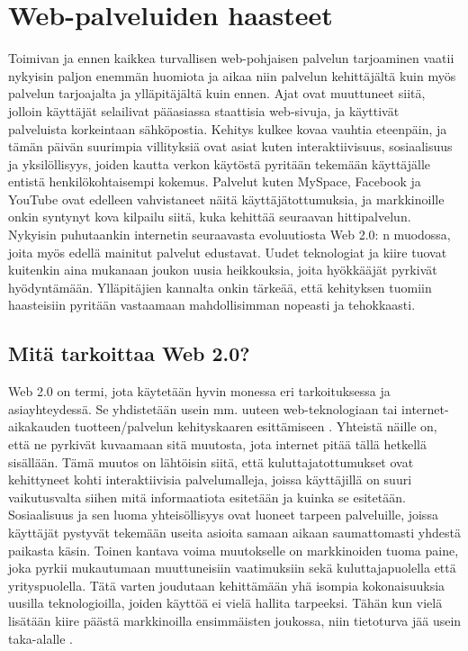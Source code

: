 
\chapter{Web-palveluiden haasteet}

Toimivan ja ennen kaikkea turvallisen web-pohjaisen palvelun tarjoaminen vaatii
nykyisin paljon enemmän huomiota ja aikaa niin palvelun kehittäjältä kuin myös
palvelun tarjoajalta ja ylläpitäjältä kuin ennen. Ajat ovat muuttuneet siitä,
jolloin käyttäjät selailivat pääasiassa staattisia web-sivuja, ja käyttivät
palveluista korkeintaan sähköpostia. Kehitys kulkee kovaa vauhtia eteenpäin, ja
tämän päivän suurimpia villityksiä ovat asiat kuten interaktiivisuus,
sosiaalisuus ja yksilöllisyys, joiden kautta verkon käytöstä pyritään tekemään
käyttäjälle entistä henkilökohtaisempi kokemus. Palvelut kuten MySpace,
Facebook ja YouTube ovat edelleen vahvistaneet näitä käyttäjätottumuksia, ja
markkinoille onkin syntynyt kova kilpailu siitä, kuka kehittää seuraavan
hittipalvelun. Nykyisin puhutaankin internetin seuraavasta evoluutiosta Web 2.0:
n muodossa, joita myös edellä mainitut palvelut edustavat. Uudet teknologiat ja
kiire tuovat kuitenkin aina mukanaan joukon uusia heikkouksia, joita hyökkääjät
pyrkivät hyödyntämään. Ylläpitäjien kannalta onkin tärkeää, että kehityksen
tuomiin haasteisiin pyritään vastaamaan mahdollisimman nopeasti ja tehokkaasti.

\section{Mitä tarkoittaa Web 2.0?}

Web 2.0 on termi, jota käytetään hyvin monessa eri tarkoituksessa ja
asiayhteydessä. Se yhdistetään usein mm. uuteen web-teknologiaan tai internet-
aikakauden tuotteen/palvelun kehityskaaren esittämiseen \cite{WEB2}. Yhteistä näille
on, että ne pyrkivät kuvaamaan sitä muutosta, jota internet pitää tällä
hetkellä sisällään. Tämä muutos on lähtöisin siitä, että kuluttajatottumukset
ovat kehittyneet kohti interaktiivisia palvelumalleja, joissa käyttäjillä on
suuri vaikutusvalta siihen mitä informaatiota esitetään ja kuinka se esitetään.
Sosiaalisuus ja sen luoma yhteisöllisyys ovat luoneet tarpeen palveluille,
joissa käyttäjät pystyvät tekemään useita asioita samaan aikaan saumattomasti
yhdestä paikasta käsin. Toinen kantava voima muutokselle on markkinoiden tuoma
paine, joka pyrkii mukautumaan muuttuneisiin vaatimuksiin sekä
kuluttajapuolella että yrityspuolella. Tätä varten joudutaan kehittämään yhä
isompia kokonaisuuksia uusilla teknologioilla, joiden käyttöä ei vielä hallita
tarpeeksi. Tähän kun vielä lisätään kiire päästä markkinoilla ensimmäisten
joukossa, niin tietoturva jää usein taka-alalle \cite{WEB2b}.

